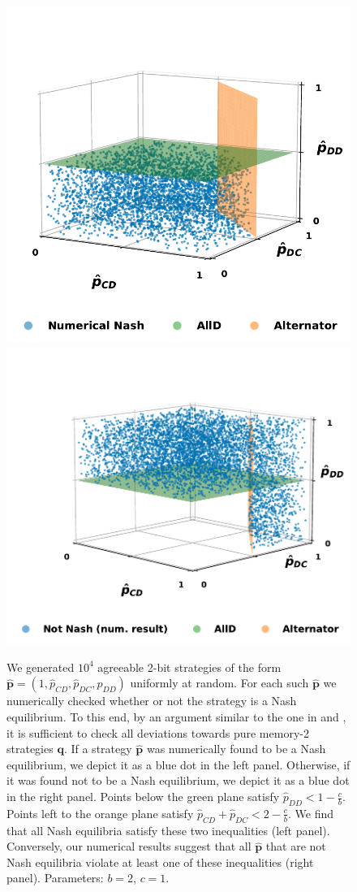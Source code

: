 \documentclass{article}
\theoremstyle{definition}
\begin{document}
\begin{figure}[t]
  \centering
  \includegraphics[width=.45\textwidth]{static/for_akin_no_proved_area.pdf}
  \includegraphics[width=.5\textwidth]{static/for_akin_non_nash.pdf}
  \caption{We generated $10^4$ agreeable 2-bit strategies of the form $\mathbf{\hat{p}}=(1,\hat{p}_{CD},\hat{p}_{DC},\hat{p}_{DD})$ uniformly at random. 
  For each such $\mathbf{\hat{p}}$ we numerically checked whether or not the strategy is a Nash equilibrium. 
  To this end, by an argument similar to the one in \citep{press:PNAS:2012} and  \citep{mcavoy:PRSA:2019}, it is sufficient to check all deviations towards pure memory-2 strategies $\mathbf{q}$.
  If a strategy $\mathbf{\hat{p}}$ was numerically found to be a Nash equilibrium, we depict it as a blue dot in the left panel.
  Otherwise, if it was found not to be a Nash equilibrium, we depict it as a blue dot in the right panel.  
  Points below the green plane satisfy $\hat{p}_{DD} < 1\!-\! \frac{c}{b}$. 
  Points left to the orange plane satisfy $\hat{p}_{CD} + \hat{p}_{DC} < 2-\frac{c}{b}$.
  We find that all Nash equilibria satisfy these two inequalities (left panel). 
  Conversely, our numerical results suggest that all $\mathbf{\hat{p}}$ that are not Nash equilibria violate at least one of these inequalities (right panel).
  Parameters: $b\!=\!2$, $c\!=\!1$.
  }
\end{figure}

~\\

\end{document}
